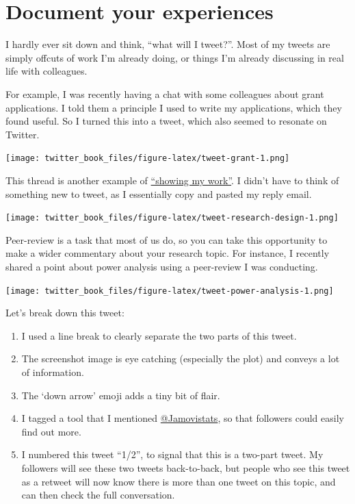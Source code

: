 \documentclass[
]{book}
\providecommand{\tightlist}{%
  \setlength{\itemsep}{0pt}\setlength{\parskip}{0pt}}
\begin{document}
\hypertarget{document-your-experiences}{%
\section*{Document your experiences}\label{document-your-experiences}}

I hardly ever sit down and think, ``what will I tweet?''. Most of my tweets are simply offcuts of work I'm already doing, or things I'm already discussing in real life with colleagues.

For example, I was recently having a chat with some colleagues about grant applications. I told them a principle I used to write my applications, which they found useful. So I turned this into a tweet, which also seemed to resonate on Twitter.

\texttt{[image: twitter\_book\_files/figure-latex/tweet-grant-1.png]}

This thread is another example of \href{https://austinkleon.com/show-your-work/}{``showing my work''}. I didn't have to think of something new to tweet, as I essentially copy and pasted my reply email.

\texttt{[image: twitter\_book\_files/figure-latex/tweet-research-design-1.png]}

Peer-review is a task that most of us do, so you can take this opportunity to make a wider commentary about your research topic. For instance, I recently shared a point about power analysis using a peer-review I was conducting.

\texttt{[image: twitter\_book\_files/figure-latex/tweet-power-analysis-1.png]}

Let's break down this tweet:

\begin{enumerate}
\def\labelenumi{\arabic{enumi}.}
\tightlist
\item
  I used a line break to clearly separate the two parts of this tweet.
\item
  The screenshot image is eye catching (especially the plot) and conveys a lot of information.
\item
  The `down arrow' emoji adds a tiny bit of flair.
\item
  I tagged a tool that I mentioned \href{https://twitter.com/Jamovistats}{@Jamovistats}, so that followers could easily find out more.
\item
  I numbered this tweet ``1/2'', to signal that this is a two-part tweet. My followers will see these two tweets back-to-back, but people who see this tweet as a retweet will now know there is more than one tweet on this topic, and can then check the full conversation.
\end{enumerate}
\end{document}
